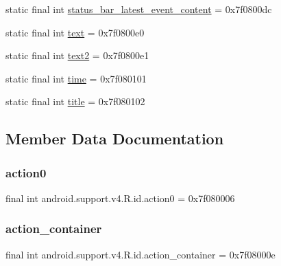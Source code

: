\begin{DoxyCompactItemize}
\item 
static final int \mbox{\hyperlink{classandroid_1_1support_1_1v4_1_1R_1_1id_a229fca951cbfa57fc3abda27dc9de03a}{status\+\_\+bar\+\_\+latest\+\_\+event\+\_\+content}} = 0x7f0800dc
\item 
static final int \mbox{\hyperlink{classandroid_1_1support_1_1v4_1_1R_1_1id_a9849f260d54f8bed2873f6421aee7723}{text}} = 0x7f0800e0
\item 
static final int \mbox{\hyperlink{classandroid_1_1support_1_1v4_1_1R_1_1id_aa02a7ff3fa383b21c5b845b18852ac3b}{text2}} = 0x7f0800e1
\item 
static final int \mbox{\hyperlink{classandroid_1_1support_1_1v4_1_1R_1_1id_a30afcc3dcdbb2cea555117ae116b61a1}{time}} = 0x7f080101
\item 
static final int \mbox{\hyperlink{classandroid_1_1support_1_1v4_1_1R_1_1id_a5c8aede2950c8a3ade737063d752bbda}{title}} = 0x7f080102
\end{DoxyCompactItemize}


\subsection{Member Data Documentation}
\mbox{\label{classandroid_1_1support_1_1v4_1_1R_1_1id_ad7592f41400f9252a235131ada4828fb}} 
\subsubsection{\texorpdfstring{action0}{action0}}
{\footnotesize\ttfamily final int android.\+support.\+v4.\+R.\+id.\+action0 = 0x7f080006\hspace{0.3cm}{\ttfamily [static]}}

\mbox{\label{classandroid_1_1support_1_1v4_1_1R_1_1id_a1617e4a9372cb50c61bb626f78a0a55d}} 
\subsubsection{\texorpdfstring{action\+\_\+container}{action\_container}}
{\footnotesize\ttfamily final int android.\+support.\+v4.\+R.\+id.\+action\+\_\+container = 0x7f08000e\hspace{0.3cm}{\ttfamily [static]}}


